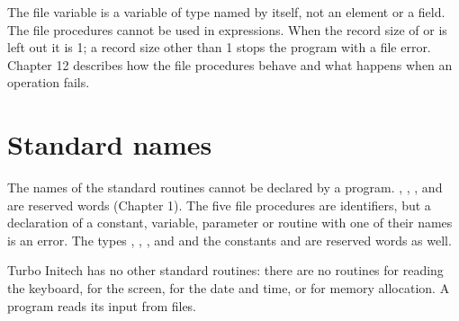 The file variable is a variable of type  named by itself, not an
element or a field.  The file procedures cannot be used in expressions.
When the record size of  or  is
left out it is 1; a record size other than 1 stops the program with a
file error.  Chapter 12 describes how the file procedures behave and what
happens when an operation fails.

\section{Standard names}
The names of the standard routines cannot be declared by a program.
, , , 
and  are reserved words (Chapter 1).  The five file
procedures are identifiers, but a declaration of a constant, variable,
parameter or routine with one of their names is an error.  The types
, , ,  and  and the
constants  and  are reserved words as well.

Turbo Initech has no other standard routines: there are no routines for
reading the keyboard, for the screen, for the date and time, or for memory
allocation.  A program reads its input from files.
